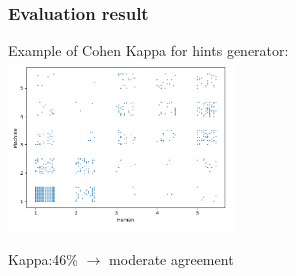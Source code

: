 \documentclass{beamer}
\begin{document}
\begin{frame}
\frametitle{Evaluation result}
\begin{center}
	
	
	
	Example of Cohen Kappa for hints generator: \\
	\includegraphics[width=60mm]{kohen.png} 
	
	
\end{center}
Kappa:46\% $\rightarrow$ moderate agreement
\end{frame}
\end{document}
